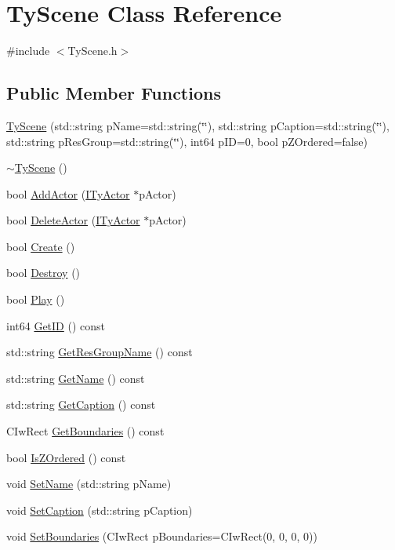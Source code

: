 \hypertarget{class_ty_scene}{
\section{TyScene Class Reference}
\label{class_ty_scene}
}


{\ttfamily \#include $<$TyScene.h$>$}

\subsection*{Public Member Functions}
\begin{DoxyCompactItemize}
\item 
\hyperlink{class_ty_scene_a4a67e21195aefc4cffa558bf3dc8eff9}{TyScene} (std::string pName=std::string(\char`\"{}\char`\"{}), std::string pCaption=std::string(\char`\"{}\char`\"{}), std::string pResGroup=std::string(\char`\"{}\char`\"{}), int64 pID=0, bool pZOrdered=false)
\item 
\hyperlink{class_ty_scene_a8ca66fa1d8619844217c2179b500473b}{$\sim$TyScene} ()
\item 
bool \hyperlink{class_ty_scene_a32370e2c1e0e18df025bfcb75a1d1dd6}{AddActor} (\hyperlink{class_i_ty_actor}{ITyActor} $\ast$pActor)
\item 
bool \hyperlink{class_ty_scene_aff2c7ea3337159d94ddf022ed7c631ee}{DeleteActor} (\hyperlink{class_i_ty_actor}{ITyActor} $\ast$pActor)
\item 
bool \hyperlink{class_ty_scene_ac1c97c365baed1b67acf9e0cffa9bfbb}{Create} ()
\item 
bool \hyperlink{class_ty_scene_a79a211baad6c0140f5af097460b17274}{Destroy} ()
\item 
bool \hyperlink{class_ty_scene_abd05190c7a08337256da8a2c48da0e5e}{Play} ()
\item 
int64 \hyperlink{class_ty_scene_a9e0456ca8013894f9af528a2c923dd44}{GetID} () const 
\item 
std::string \hyperlink{class_ty_scene_a105fd6a55f2e91229745c400ba2ce1a4}{GetResGroupName} () const 
\item 
std::string \hyperlink{class_ty_scene_aeb5c110acf3cec8670bf578220111ae6}{GetName} () const 
\item 
std::string \hyperlink{class_ty_scene_a68547f8db4f2b5f83638108e182a99b2}{GetCaption} () const 
\item 
CIwRect \hyperlink{class_ty_scene_aff2fbf485113b4c8e469868389050139}{GetBoundaries} () const 
\item 
bool \hyperlink{class_ty_scene_afedc682078fd7d25e71e2fa32f8b27c9}{IsZOrdered} () const 
\item 
void \hyperlink{class_ty_scene_ace5cc863c9c541f2329abe7fca343208}{SetName} (std::string pName)
\item 
void \hyperlink{class_ty_scene_a213aec59ed87ec5fb464ba7cd3c149f8}{SetCaption} (std::string pCaption)
\item 
void \hyperlink{class_ty_scene_a9b1924e36b7f10cc4a0838790e262079}{SetBoundaries} (CIwRect pBoundaries=CIwRect(0, 0, 0, 0))
\end{DoxyCompactItemize}
